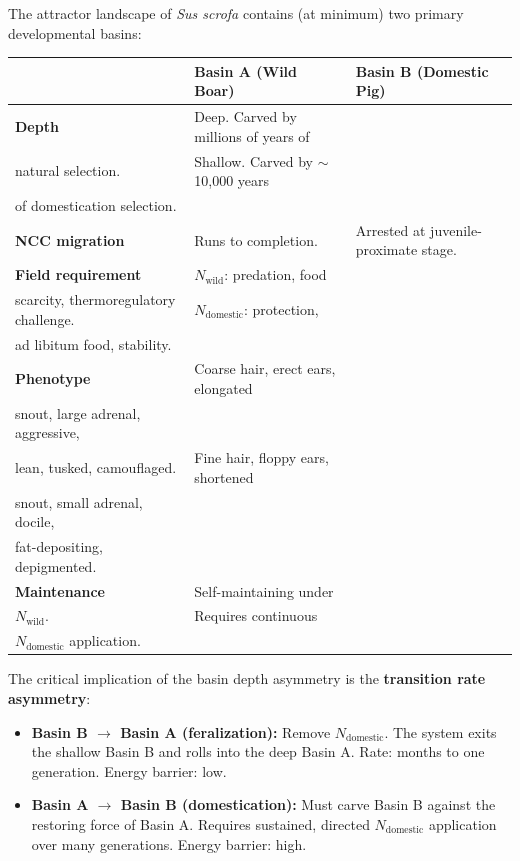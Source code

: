 \documentclass[11pt, a4paper]{article}
\begin{document}
The attractor landscape of \textit{Sus scrofa} contains
(at minimum) two primary developmental basins:

\begin{center}
\begin{tabular}{p{2.8cm}p{5.2cm}p{5.2cm}}
\toprule
& \textbf{Basin A (Wild Boar)} &
  \textbf{Basin B (Domestic Pig)} \\
\midrule
\textbf{Depth} &
  Deep. Carved by millions of years of\\
  natural selection. &
  Shallow. Carved by $\sim$10,000 years\\
  of domestication selection. \\[0.3em]
\textbf{NCC migration} &
  Runs to completion. &
  Arrested at juvenile-proximate stage. \\[0.3em]
\textbf{Field requirement} &
  $N_{\text{wild}}$: predation, food\\
  scarcity, thermoregulatory challenge. &
  $N_{\text{domestic}}$: protection,\\
  ad libitum food, stability. \\[0.3em]
\textbf{Phenotype} &
  Coarse hair, erect ears, elongated\\
  snout, large adrenal, aggressive,\\
  lean, tusked, camouflaged. &
  Fine hair, floppy ears, shortened\\
  snout, small adrenal, docile,\\
  fat-depositing, depigmented. \\[0.3em]
\textbf{Maintenance} &
  Self-maintaining under\\
  $N_{\text{wild}}$. &
  Requires continuous\\
  $N_{\text{domestic}}$ application. \\
\bottomrule
\end{tabular}
\end{center}

\vspace{0.3em}
The critical implication of the basin depth asymmetry
is the \textbf{transition rate asymmetry}:

\begin{itemize}[itemsep=0.15em]
  \item \textbf{Basin B $\rightarrow$ Basin A
    (feralization):} Remove $N_{\text{domestic}}$.
    The system exits the shallow Basin B and rolls
    into the deep Basin A. Rate: months to one
    generation. Energy barrier: low.
  \item \textbf{Basin A $\rightarrow$ Basin B
    (domestication):} Must carve Basin B against the
    restoring force of Basin A. Requires sustained,
    directed $N_{\text{domestic}}$ application over
    many generations. Energy barrier: high.
\end{itemize}
\end{document}
